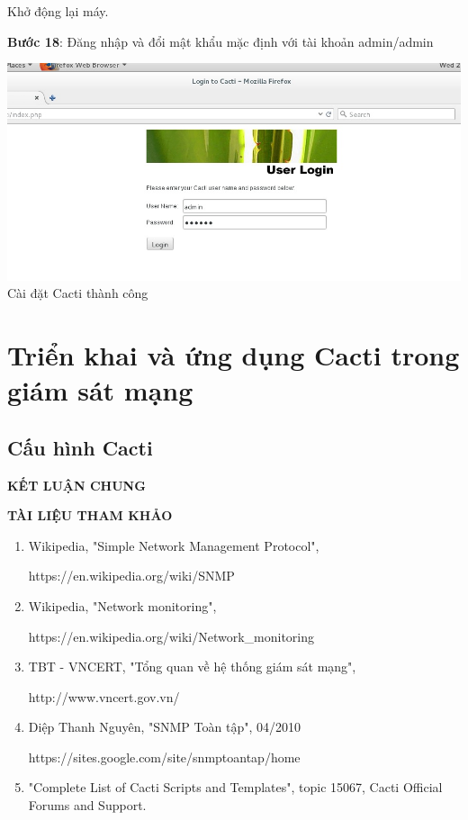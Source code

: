 \documentclass[12pt,oneside,a4paper,reqno]{report}
\begin{document}
\begin{large}
Khở động lại máy.

\textbf{Bước 18}: Đăng nhập và đổi mật khẩu mặc định với tài khoản admin/admin

\begin{center}
	\includegraphics[scale=0.6]{images/cacti-login.jpg}\\
	Cài đặt Cacti thành công
\end{center}

\section{Triển khai và ứng dụng Cacti trong giám sát mạng}
\subsection{Cấu hình Cacti}

\newpage
\vspace*{0.2cm}
\centerline{\Large\bf KẾT LUẬN CHUNG}
\vspace*{0.5cm}

\newpage
\vspace*{0.2cm}
\centerline{\Large\bf TÀI LIỆU THAM KHẢO}
\vspace*{0.5cm}

%
\begin{enumerate}
\item Wikipedia, "Simple Network Management Protocol",

https://en.wikipedia.org/wiki/SNMP
\item{Wikipedia, "Network monitoring",

https://en.wikipedia.org/wiki/Network\_monitoring}
\item{TBT - VNCERT, "Tổng quan về hệ thống giám sát mạng",

http://www.vncert.gov.vn/}
\item{Diệp Thanh Nguyên, "SNMP Toàn tập", 04/2010

https://sites.google.com/site/snmptoantap/home}
\item "Complete List of Cacti Scripts and Templates", topic 15067, Cacti Official Forums and Support.
\end{enumerate}
	
\end{large}		
\end{document}
